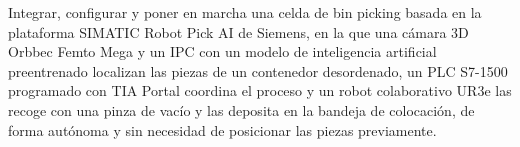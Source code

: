 Integrar, configurar y poner en marcha una celda de bin picking basada en la plataforma SIMATIC Robot Pick AI de
Siemens, en la que una cámara 3D Orbbec Femto Mega y un IPC con un modelo de inteligencia artificial preentrenado
localizan las piezas de un contenedor desordenado, un PLC S7-1500 programado con TIA Portal coordina el proceso y
un robot colaborativo UR3e las recoge con una pinza de vacío y las deposita en la bandeja de colocación, de forma
autónoma y sin necesidad de posicionar las piezas previamente.
